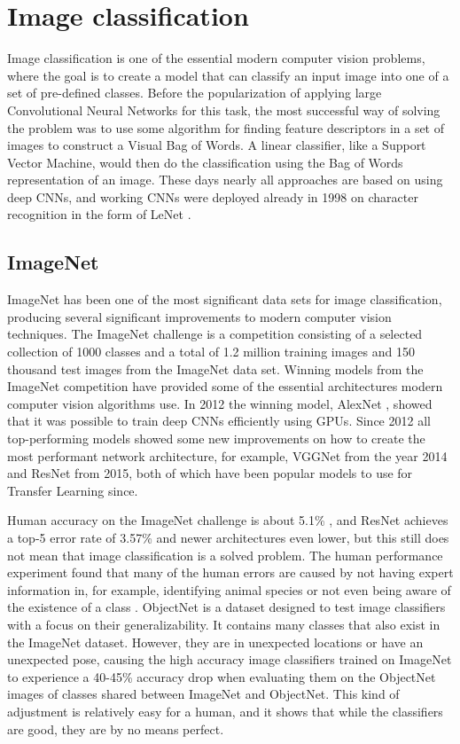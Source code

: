 \chapter{Image classification}
Image classification is one of the essential modern computer vision problems, where the goal is to create a model that can classify an input image into one of a set of pre-defined classes. Before the popularization of applying large Convolutional Neural Networks for this task, the most successful way of solving the problem was to use some algorithm for finding feature descriptors in a set of images to construct a Visual Bag of Words.  A linear classifier, like a Support Vector Machine, would then do the classification using the Bag of Words representation of an image. These days nearly all approaches are based on using deep CNNs, and working CNNs were deployed already in 1998 on character recognition in the form of LeNet \citep{leNet}.

\section{ImageNet}

ImageNet \citep{imagenet} has been one of the most significant data sets for image classification, producing several significant improvements to modern computer vision techniques.
The ImageNet challenge \citep{ILSVRC} is a competition consisting of a selected collection of 1000 classes and a total of 1.2 million training images and 150 thousand test images from the ImageNet data set.
Winning models from the ImageNet competition have provided some of the essential architectures modern computer vision algorithms use.
In 2012 the winning model, AlexNet \citep{alexNet}, showed that it was possible to train deep CNNs efficiently using GPUs. Since 2012 all top-performing models showed some new improvements on how to create the most performant network architecture, for example, VGGNet from the year 2014 and ResNet \citep{resNet} from 2015, both of which have been popular models to use for Transfer Learning since.

Human accuracy on the ImageNet challenge is about 5.1\% \citep{imageNet_summary}, and ResNet achieves a top-5 error rate of 3.57\% \citep{resNet} and newer architectures even lower, but this still does not mean that image classification is a solved problem. The human performance experiment found that many of the human errors are caused by not having expert information in, for example, identifying animal species or not even being aware of the existence of a class \citep{imageNet_summary}. ObjectNet \citep{objectNet} is a dataset designed to test image classifiers with a focus on their generalizability. It contains many classes that also exist in the ImageNet dataset. However, they are in unexpected locations or have an unexpected pose, causing the high accuracy image classifiers trained on ImageNet to experience a 40-45\% accuracy drop when evaluating them on the ObjectNet images of classes shared between ImageNet and ObjectNet. This kind of adjustment is relatively easy for a human, and it shows that while the classifiers are good, they are by no means perfect.

